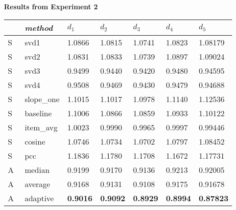 \begin{table}[p]
  \centering

  \textbf{Results from Experiment 2}

  \vspace{3em}

  \begin{tabular*}{\textwidth}{ l p{3cm} p{1.5cm} p{1.5cm} p{1.5cm} p{1.5cm} p{1.5cm} }
    \toprule
      ~ & \emph{method} & 
      $d_1$ & $d_2$ & $d_3$ & $d_4$ & $d_5$ \\ 
    \midrule
    S & svd1       &  1.0866  &  1.0815  &  1.0741  &  1.0823  &  1.08179  \\
    S & svd2       &  1.0831  &  1.0833  &  1.0739  &  1.0897  &  1.09024  \\
    S & svd3       &  0.9499  &  0.9440  &  0.9420  &  0.9480  &  0.94595  \\
    S & svd4       &  0.9508  &  0.9469  &  0.9430  &  0.9479  &  0.94688  \\
    S & slope\_one &  1.1015  &  1.1017  &  1.0978  &  1.1140  &  1.12536  \\
    S & baseline   &  1.1006  &  1.0866  &  1.0859  &  1.0933  &  1.10122  \\
    S & item\_avg  &  1.0023  &  0.9990  &  0.9965  &  0.9997  &  0.99446  \\
    S & cosine     &  1.0746  &  1.0734  &  1.0702  &  1.0797  &  1.08452  \\
    S & pcc        &  1.1836  &  1.1780  &  1.1708  &  1.1672  &  1.17731  \\
    \midrule
    A & median     &  0.9199  &  0.9170  &  0.9136  &  0.9213  &  0.92005  \\
    A & average    &  0.9168  &  0.9131  &  0.9108  &  0.9175  &  0.91678  \\
    A & adaptive    &  \textbf{0.9016}  &  \textbf{0.9092}  &  \textbf{0.8929}  &  \textbf{0.8994}  &  \textbf{0.87823}  \\
    \bottomrule
  \end{tabular*}

  \vspace{3em}


\end{table}
